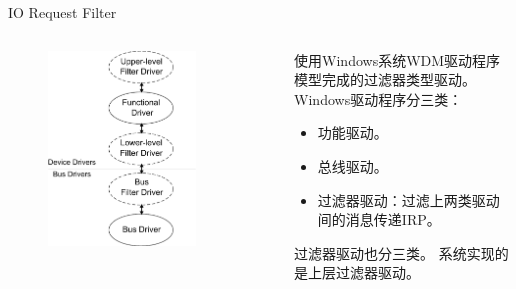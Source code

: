 \documentclass[compress]{beamer}
\begin{document}
\begin{frame}{IO Request Filter}
    \begin{columns}
    \begin{column}{0.5\textwidth}
        \begin{figure}
        \includegraphics[width=0.8\textwidth]{../graph/io-stack-filter}
        \end{figure}
    \end{column}
    \begin{column}{0.5\textwidth}
        使用Windows系统WDM驱动程序模型完成的过滤器类型驱动。
        Windows驱动程序分三类：
        \begin{itemize}
        \item 功能驱动。
        \item 总线驱动。
        \item 过滤器驱动：过滤上两类驱动间的消息传递IRP。
        \end{itemize}
        过滤器驱动也分三类。
        系统实现的是上层过滤器驱动。
    \end{column}
    \end{columns}
\end{frame}
\end{document}
